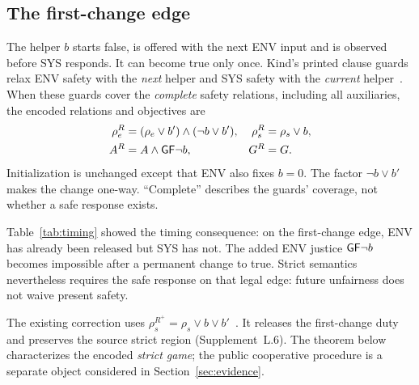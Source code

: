 \subsection{The first-change edge}
The helper $b$ starts false, is offered with the next ENV input and is
observed before SYS responds. It can become true only once. Kind's printed
clause guards relax ENV safety with the \emph{next} helper and SYS safety
with the \emph{current} helper~\cite[Sec.~4.1]{kind}. When these guards cover
the \emph{complete} safety relations, including all auxiliaries, the encoded
relations and objectives are
\begin{equation}
\begin{aligned}
\rho_e^R&=(\rho_e\lor b')\land(\neg b\lor b'),&
\rho_s^R&=\rho_s\lor b,\\
A^R&=A\land\mathsf{G}\mathsf{F}\neg b,&G^R&=G.
\end{aligned}\label{hpb:literal}
\end{equation}
Initialization is unchanged except that ENV also fixes $b=0$.
The factor $\neg b\lor b'$ makes the change one-way. ``Complete'' describes
the guards' coverage, not whether a safe response exists.


Table~\ref{tab:timing} showed the timing consequence: on the first-change
edge, ENV has already been released but SYS has not. The added ENV justice $\mathsf{G}\mathsf{F}\neg b$ becomes
impossible after a permanent change to true. Strict semantics nevertheless
requires the safe response on that legal edge: future unfairness does not
waive present safety.

The existing correction uses
$\rho_s^{R^+}=\rho_s\lor b\lor b'$~\cite{spectrarelease2024}.
It releases the first-change duty and preserves the source strict region
(Supplement~L.6). The theorem below characterizes the encoded \emph{strict
game}; the public cooperative procedure is a separate object considered
in Section~\ref{sec:evidence}.
